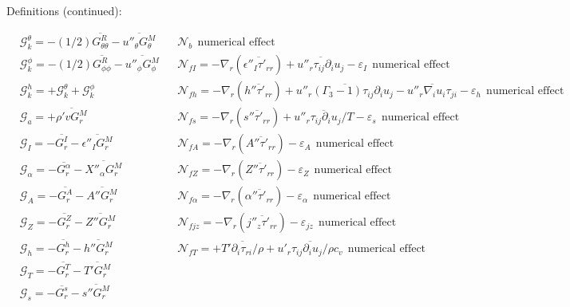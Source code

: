 \documentclass[10pt,paper=a4]{report}
\newcommand{\eht}{\overline}
\begin{document}
\begin{table*}
\label{tab:rans-cont}
\caption{Definitions (continued):}
\begin{align} 
& \mathcal G_k^\theta = -(1/2)\eht{G_{\theta \theta}^R} - \eht{u''_\theta G_\theta^M}  & &  \mathcal N_b \ \ \mbox{numerical effect} \nonumber \\               
& \mathcal G_k^\phi  = -(1/2)\eht{G_{\phi \phi}^R} - \eht{u''_\phi G_\phi^M}   & &  \mathcal N_{fI} = -\nabla_r (\eht{\epsilon''_I \tau'_{rr}}) + \eht{u''_r \tau_{ij} \partial_i u_j} -\varepsilon_I  \ \ \mbox{numerical effect} \nonumber \\               
& \mathcal G_k^h = +\mathcal G_k^\theta + \mathcal G_k^\phi                  & &  \mathcal N_{fh} = -\nabla_r (\eht{h'' \tau'_{rr}}) + \eht{u''_r (\Gamma_3 - 1) \tau_{ij} \partial_i u_j} - \eht{ u''_r \nabla_i u_i \tau_{ji}} - \varepsilon_h   \ \ \mbox{numerical effect} \nonumber \\                                   
& \mathcal G_a = +\eht{\rho' v G_r^M}                                     & &  \mathcal N_{fs} = -\nabla_r (\eht{s''\tau'_{rr}}) + \eht{u''_r \tau_{ij} \partial_i u_j/T} -\varepsilon_s  \ \ \mbox{numerical effect} \nonumber \\     
& \mathcal G_I = -\eht{G_{r}^I} - \eht{\epsilon''_I G_r^M}  & &  \mathcal N_{fA} = -\nabla_r (\eht{A''\tau'_{rr}}) - \varepsilon_A \ \ \mbox{numerical effect} \nonumber \\                                       
& \mathcal G_\alpha =  -\eht{G_{r}^\alpha} - \eht{X''_\alpha G_r^M} & &  \mathcal N_{fZ} = -\nabla_r (\eht{Z''\tau'_{rr}}) - \varepsilon_Z \ \ \mbox{numerical effect} \nonumber \\                             
& \mathcal G_A =  -\eht{G_{r}^A} - \eht{A'' G_r^M}  & & \mathcal N_{f\alpha} = -\nabla_r (\eht{\alpha''\tau'_{rr}}) - \varepsilon_\alpha  \ \ \mbox{numerical effect} \nonumber \\
& \mathcal G_Z =  -\eht{G_{r}^Z} - \eht{Z'' G_r^M}  & & \mathcal N_{fjz} =  -\nabla_r (\eht{j''_z \tau'_{rr}}) - \varepsilon_{jz}  \ \ \mbox{numerical effect} \nonumber \\ 
& \mathcal G_h =  -\eht{G_{r}^h} - \eht{h'' G_r^M}  & & \mathcal N_{fT} =  + \eht{T'\partial_i \tau_{ri} / \rho} + \eht{u'_r \tau_{ij} \partial_i u_j / \rho c_v} \ \ \mbox{numerical effect} \nonumber \\ 
& \mathcal G_T =  -\eht{G_{r}^T} - \eht{T' G_r^M}  & & \nonumber  \\
& \mathcal G_{s} = -\eht{G_{r}^s} - \eht{s'' G_r^M} & & \nonumber \\

\end{align}
\end{table*}
\end{document}
